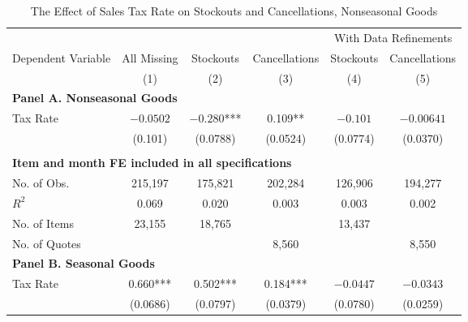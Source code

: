 \documentclass[12pt]{article}
\begin{document}
		\begin{table}[t]
			\centering 
			\caption{The Effect of Sales Tax Rate on Stockouts and Cancellations, Nonseasonal Goods}
			\label{tab:stnoseas}%
			\begin{threeparttable}
				\begin{tabularx}{\textwidth}{lccccc}
					\hline
					&             &           &               & \multicolumn{2}{c}{With Data Refinements} \\
					Dependent Variable & All Missing & Stockouts & Cancellations & Stockouts & Cancellations 	\\ \hline
					&     (1)     &    (2)    &      (3)      &    (4)    &      (5)         \\
					\hline
					\multicolumn{6}{l}{\textbf{Panel A. Nonseasonal Goods}} \\ 
					Tax Rate           &   $-0.0502$   & $-0.280$*** &    0.109**    &  $-0.101$   &   $-0.00641$       \\
					&   (0.101)   & (0.0788)  &   (0.0524)    & (0.0774)  &   (0.0370)       \\
					&          &          &          &          &  \\
					\multicolumn{6}{l}{\textbf{Item and month FE included in all specifications}} \\
					No. of Obs.        &   215,197   &  175,821  &    202,284    &  126,906  &    194,277       \\
					$R^2$              &    0.069    &   0.020   &     0.003     &   0.003   &     0.002        \\
					No. of Items	   &  23,155  	 &  18,765   &               &  13,437   &  				\\
					No. of Quotes      &             &           &     8,560     &           &     8,550        \\ \hline
					\multicolumn{6}{l}{\textbf{Panel B. Seasonal Goods}} \\
					Tax Rate                  & 0.660*** & 0.502*** & 0.184*** & $-0.0447$  & $-0.0343$                        \\
					& (0.0686) & (0.0797) & (0.0379) & (0.0780) & (0.0259)                       \\

\end{tabularx}
\end{threeparttable}
\end{table}
\end{document}
